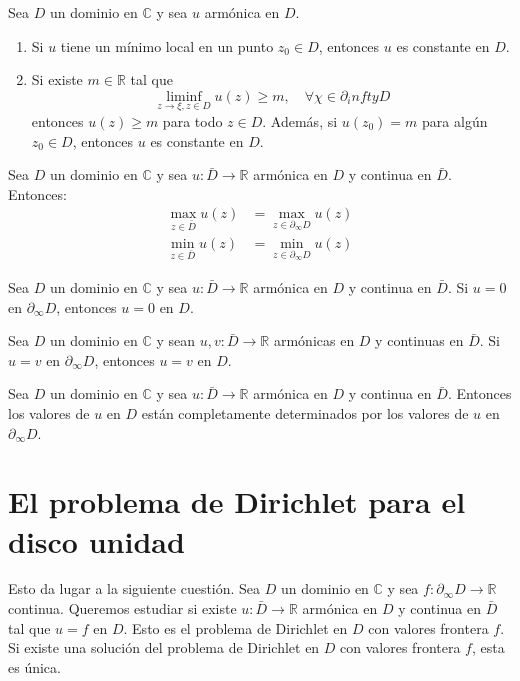 \begin{theorem}
    Sea $D$ un dominio en $\mathbb{C}$ y sea $u$ armónica en $D$.
    \begin{enumerate}
        \item Si $u$ tiene un mínimo local en un punto $z_0 \in D$, entonces $u$ es constante en $D$.
        \item Si existe $m \in \mathbb{R}$ tal que
              $$\liminf_{z \to \xi, z \in D} u(z) \geq m, \quad \forall \chi \in \partial_infty D$$
              entonces $u(z) \geq m$ para todo $z \in D$.
              Además, si $u(z_0) = m$ para algún $z_0 \in D$, entonces $u$ es constante en $D$.
    \end{enumerate}
\end{theorem}

\begin{corollary}
    Sea $D$ un dominio en $\mathbb{C}$ y sea $u: \bar{D} \to \mathbb{R}$ armónica en $D$ y continua en $\bar{D}$.
    Entonces:
    \begin{align*}
        \max_{z \in \bar{D}} u(z) & = \max_{z \in \partial_\infty D} u(z) \\
        \min_{z \in \bar{D}} u(z) & = \min_{z \in \partial_\infty D} u(z)
    \end{align*}
\end{corollary}

\begin{corollary}
    Sea $D$ un dominio en $\mathbb{C}$ y sea $u: \bar{D} \to \mathbb{R}$ armónica en $D$ y continua en $\bar{D}$.
    Si $u = 0$ en $\partial_\infty D$, entonces $u = 0$ en $D$.
\end{corollary}

\begin{corollary}
    Sea $D$ un dominio en $\mathbb{C}$ y sean $u, v: \bar{D} \to \mathbb{R}$ armónicas en $D$ y continuas en $\bar{D}$.
    Si $u = v$ en $\partial_\infty D$, entonces $u = v$ en $D$.
\end{corollary}

\begin{remark}
    Sea $D$ un dominio en $\mathbb{C}$ y sea $u: \bar{D} \to \mathbb{R}$ armónica en $D$ y continua en $\bar{D}$.
    Entonces los valores de $u$ en $D$ están completamente determinados por los valores de $u$ en $\partial_\infty D$.
\end{remark}

\section{El problema de Dirichlet para el disco unidad}
Esto da lugar a la siguiente cuestión.
Sea $D$ un dominio en $\mathbb{C}$ y sea $f: \partial_\infty D \to \mathbb{R}$ continua.
Queremos estudiar si existe $u: \bar{D} \to \mathbb{R}$ armónica en $D$ y continua en $\bar{D}$ tal que $u = f$ en $D$.
Esto es el problema de Dirichlet en $D$ con valores frontera $f$.
Si existe una solución del problema de Dirichlet en $D$ con valores frontera $f$, esta es única.

